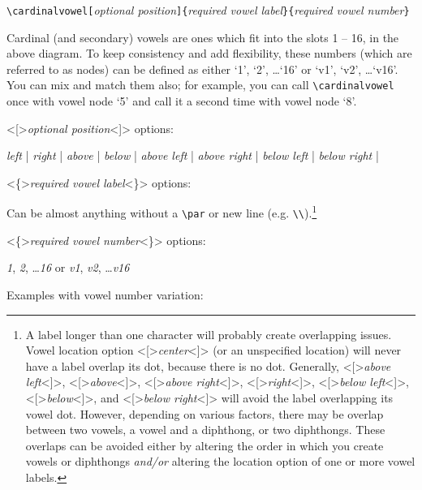\documentclass{article}
\def\\{}%
\def\texttt#1{<#1>}%
\begin{document}
\medskip
\qquad \verb+\cardinalvowel[+\textit{optional position}\verb+]{+\textit{required vowel label}\verb+}{+\textit{required vowel number}\verb+}+
\bigskip

Cardinal (and secondary) vowels are ones which fit into the slots 1 -- 16, in the above diagram.  To keep consistency and add flexibility, these numbers (which are referred to as nodes) can be defined as either `1', `2', \dots `16' or `v1', `v2', \dots `v16'.  You can mix and match them also; for example, you can call \verb|\cardinalvowel| once with vowel node `5' and call it a second time with vowel node `8'.

\bigskip

\texttt{[}\textit{optional position}\texttt{]} options:

\qquad \textit{left} | 
\textit{right} | 
\textit{above} | 
\textit{below} | 
\textit{above left} | 
\textit{above right} | 
\textit{below left} | 
\textit{below right} | 

\bigskip

\texttt{\{}\textit{required vowel label}\texttt{\}} options:

\qquad Can be almost anything without a \verb|\par| or new line (e.g. \verb+\\+).\footnote{A label longer than one character will probably create overlapping issues.  Vowel location option \texttt{[}\textit{center}\texttt{]} (or an unspecified location) will never have a label overlap its dot, because there is no dot.  Generally, \texttt{[}\textit{above left}\texttt{]}, \texttt{[}\textit{above}\texttt{]}, \texttt{[}\textit{above right}\texttt{]}, \texttt{[}\textit{right}\texttt{]}, \texttt{[}\textit{below left}\texttt{]}, \texttt{[}\textit{below}\texttt{]}, and \texttt{[}\textit{below right}\texttt{]} will avoid the label overlapping its vowel dot.  However, depending on various factors, there may be overlap between two vowels, a vowel and a diphthong, or two diphthongs.  These overlaps can be avoided either by altering the order in which you create vowels or diphthongs \textit{and/or} altering the location option of one or more vowel labels.}

\bigskip

\texttt{\{}\textit{required vowel number}\texttt{\}} options:

\qquad \textit{1}, \textit{2}, \dots \textit{16} or \textit{v1}, \textit{v2}, \dots \textit{v16}

\bigskip
\noindent
Examples with vowel number variation:
\end{document}
